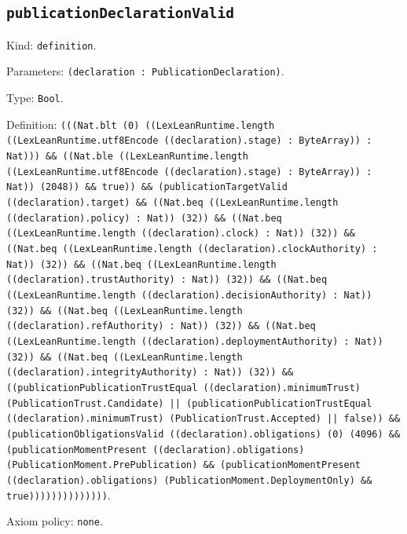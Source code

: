 \documentclass[11pt]{article}
\begin{document}
\subsection*{\texttt{publicationDeclarationValid}}
\noindent Kind: \texttt{definition}.\par
\noindent Parameters: \texttt{(declaration : PublicationDeclaration)}.\par
\noindent Type: \texttt{Bool}.\par
\noindent Definition: \texttt{(((Nat.blt (0) ((LexLeanRuntime.length ((LexLeanRuntime.utf8Encode ((declaration).stage) : ByteArray)) : Nat))) \&\& ((Nat.ble ((LexLeanRuntime.length ((LexLeanRuntime.utf8Encode ((declaration).stage) : ByteArray)) : Nat)) (2048)) \&\& true)) \&\& (publicationTargetValid ((declaration).target) \&\& ((Nat.beq ((LexLeanRuntime.length ((declaration).policy) : Nat)) (32)) \&\& ((Nat.beq ((LexLeanRuntime.length ((declaration).clock) : Nat)) (32)) \&\& ((Nat.beq ((LexLeanRuntime.length ((declaration).clockAuthority) : Nat)) (32)) \&\& ((Nat.beq ((LexLeanRuntime.length ((declaration).trustAuthority) : Nat)) (32)) \&\& ((Nat.beq ((LexLeanRuntime.length ((declaration).decisionAuthority) : Nat)) (32)) \&\& ((Nat.beq ((LexLeanRuntime.length ((declaration).refAuthority) : Nat)) (32)) \&\& ((Nat.beq ((LexLeanRuntime.length ((declaration).deploymentAuthority) : Nat)) (32)) \&\& ((Nat.beq ((LexLeanRuntime.length ((declaration).integrityAuthority) : Nat)) (32)) \&\& ((publicationPublicationTrustEqual ((declaration).minimumTrust) (PublicationTrust.Candidate) || (publicationPublicationTrustEqual ((declaration).minimumTrust) (PublicationTrust.Accepted) || false)) \&\& (publicationObligationsValid ((declaration).obligations) (0) (4096) \&\& (publicationMomentPresent ((declaration).obligations) (PublicationMoment.PrePublication) \&\& (publicationMomentPresent ((declaration).obligations) (PublicationMoment.DeploymentOnly) \&\& true))))))))))))))}.\par
\noindent Axiom policy: \texttt{none}.\par
\end{document}

